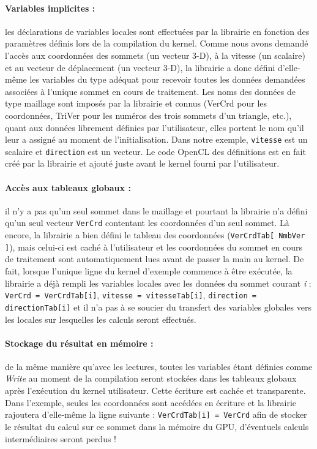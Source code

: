 \documentclass[a4paper,12pt]{article}
\begin{document}
\paragraph{Variables implicites : } les déclarations de variables locales sont effectuées par la librairie en fonction des paramètres définis lors de la compilation du kernel.
Comme nous avons demandé l'accès aux coordonnées des sommets (un vecteur 3-D), à la vitesse (un scalaire) et au vecteur de déplacement (un vecteur 3-D), la librairie a donc défini d'elle-même les variables du type adéquat pour recevoir toutes les données demandées associées à l'unique sommet en cours de traitement.
Les noms des données de type maillage sont imposés par la librairie et connus (VerCrd pour les coordonnées, TriVer pour les numéros des trois sommets d'un triangle, etc.), quant aux données librement définies par l'utilisateur, elles portent le nom qu'il leur a assigné au moment de l'initialisation.
Dans notre exemple, {\tt vitesse} est un scalaire et {\tt direction} est un vecteur. Le code OpenCL des définitions est en fait créé par la librairie et ajouté juste avant le kernel fourni par l'utilisateur.

\paragraph{Accès aux tableaux globaux : } il n'y a pas qu'un seul sommet dans le maillage et pourtant la librairie n'a défini qu'un seul vecteur {\tt VerCrd} contentant les coordonnées d'un seul sommet.
Là encore, la librairie a bien défini le tableau des coordonnées ({\tt VerCrdTab[ NmbVer ]}), mais celui-ci est caché à l'utilisateur et les coordonnées du sommet en cours de traitement sont automatiquement lues avant de passer la main au kernel.
De fait, lorsque l'unique ligne du kernel d'exemple commence à être exécutée, la librairie a déjà rempli les variables locales avec les données du sommet courant \emph{i} : {\tt VerCrd = VerCrdTab[i]}, {\tt vitesse = vitesseTab[i]}, {\tt direction = directionTab[i]} et il n'a pas à se soucier du transfert des variables globales vers les locales sur lesquelles les calculs seront effectués.

\paragraph{Stockage du résultat en mémoire : } de la même manière qu'avec les lectures, toutes les variables étant définies comme \emph{Write} au moment de la compilation seront stockées dans les tableaux globaux après l'exécution du kernel utilisateur.
Cette écriture est cachée et transparente. Dans l'exemple, seules les coordonnées sont accédées en écriture et la librairie rajoutera d'elle-même la ligne suivante : {\tt VerCrdTab[i] = VerCrd} afin de stocker le résultat du calcul sur ce sommet dans la mémoire du GPU, d'éventuels calculs intermédiaires seront perdus !
\end{document}
